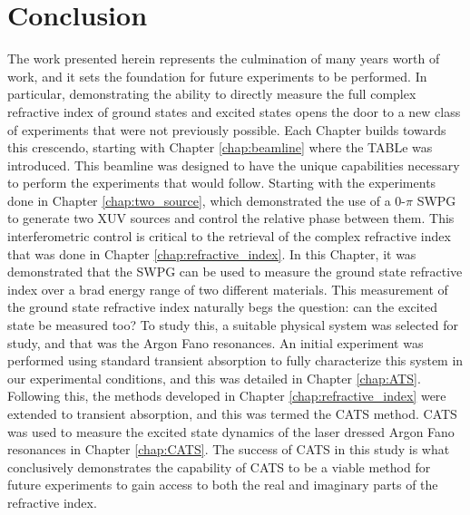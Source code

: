 \chapter{Conclusion}
\label{chap:conclusion}


The work presented herein represents the culmination of many years worth of work, and it sets the foundation for future experiments to be performed. In particular, demonstrating the ability to directly measure the full complex refractive index of ground states and excited states opens the door to a new class of experiments that were not previously possible.  Each Chapter builds towards this crescendo, starting with Chapter \ref{chap:beamline} where the TABLe was introduced.  This beamline was designed to have the unique capabilities necessary to perform the experiments that would follow.  Starting with the experiments done in Chapter \ref{chap:two_source}, which demonstrated the use of a 0-$\pi$ SWPG to generate two XUV sources and control the relative phase between them.  This interferometric control is critical to the retrieval of the complex refractive index that was done in Chapter \ref{chap:refractive_index}.  In this Chapter, it was demonstrated that the SWPG can be used to measure the ground state refractive index over a brad energy range of two different materials.  This measurement of the ground state refractive index naturally begs the question: can the excited state be measured too?  To study this, a suitable physical system was selected for study, and that was the Argon Fano resonances.  An initial experiment was performed using standard transient absorption to fully characterize this system in our experimental conditions, and this was detailed in Chapter \ref{chap:ATS}.  Following this, the methods developed in Chapter \ref{chap:refractive_index} were extended to transient absorption, and this was termed the CATS method.  CATS was used to measure the excited state dynamics of the laser dressed Argon Fano resonances in Chapter \ref{chap:CATS}.  The success of CATS in this study is what conclusively demonstrates the capability of CATS to be a viable method for future experiments to gain access to both the real and imaginary parts of the refractive index.



